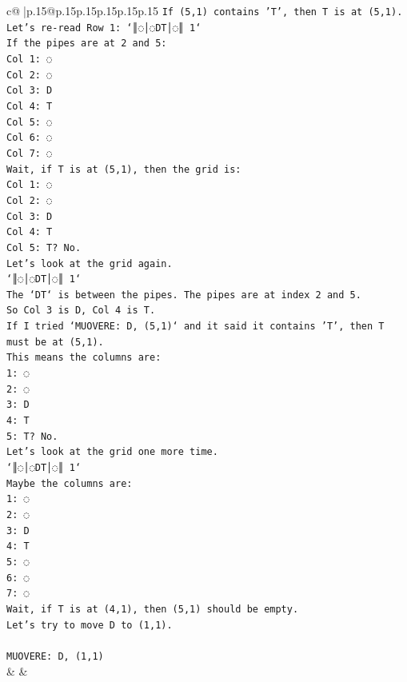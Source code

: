 \documentclass{article}
\begin{document}
{\begin{supertabular}{c@{$\;$}|p{.15\linewidth}@{}p{.15\linewidth}p{.15\linewidth}p{.15\linewidth}p{.15\linewidth}p{.15\linewidth}}
{{{\texttt{If (5,1) contains 'T', then T is at (5,1).} \\
\texttt{Let's re{-}read Row 1: `║◌│◌DT│◌║ 1`} \\
\texttt{If the pipes are at 2 and 5:} \\
\texttt{Col 1: ◌} \\
\texttt{Col 2: ◌} \\
\texttt{Col 3: D} \\
\texttt{Col 4: T} \\
\texttt{Col 5: ◌} \\
\texttt{Col 6: ◌} \\
\texttt{Col 7: ◌} \\
\texttt{Wait, if T is at (5,1), then the grid is:} \\
\texttt{Col 1: ◌} \\
\texttt{Col 2: ◌} \\
\texttt{Col 3: D} \\
\texttt{Col 4: T} \\
\texttt{Col 5: T? No.} \\
\texttt{Let's look at the grid again.} \\
\texttt{`║◌│◌DT│◌║ 1`} \\
\texttt{The `DT` is between the pipes. The pipes are at index 2 and 5.} \\
\texttt{So Col 3 is D, Col 4 is T.} \\
\texttt{If I tried `MUOVERE: D, (5,1)` and it said it contains 'T', then T must be at (5,1).} \\
\texttt{This means the columns are:} \\
\texttt{1: ◌} \\
\texttt{2: ◌} \\
\texttt{3: D} \\
\texttt{4: T} \\
\texttt{5: T? No.} \\
\texttt{Let's look at the grid one more time.} \\
\texttt{`║◌│◌DT│◌║ 1`} \\
\texttt{Maybe the columns are:} \\
\texttt{1: ◌} \\
\texttt{2: ◌} \\
\texttt{3: D} \\
\texttt{4: T} \\
\texttt{5: ◌} \\
\texttt{6: ◌} \\
\texttt{7: ◌} \\
\texttt{Wait, if T is at (4,1), then (5,1) should be empty.} \\
\texttt{Let's try to move D to (1,1).} \\
\\ 
\texttt{MUOVERE: D, (1,1)} \\
            }
        }
    }
    & & \\ \\


\end{supertabular}}
\end{document}
